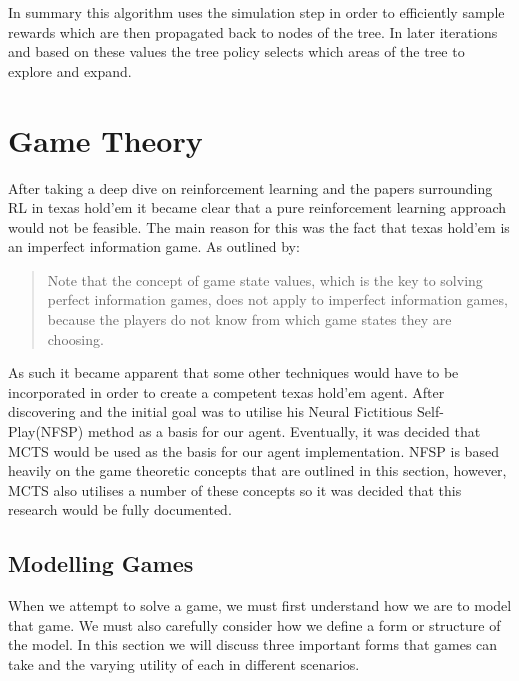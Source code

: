 In summary this algorithm uses the simulation step in order to efficiently sample rewards which
are then propagated back to nodes of the tree.
In later iterations and based on these values the tree policy selects which areas of the tree to
explore and expand.

\section{Game Theory}\label{sec:gameTheory}
After taking a deep dive on reinforcement learning and the papers surrounding RL in texas hold'em it became
clear that a pure reinforcement learning approach would not be feasible.
The main reason for this was the fact that texas hold'em is an imperfect information game.
As outlined by\citep{dahl2001reinforcement}:
\begin{quotation}
Note that the concept of game state values, which is the key to solving perfect information games,
does not apply to imperfect information games, because the players do not know from  which game states they
are choosing.
\end{quotation}
As such it became apparent that some other techniques would have to be incorporated in order to create a competent
texas hold'em agent.
After discovering\citep{heinrich2016deep} and\citep{heinrich2017reinforcement} the initial goal
was to utilise his Neural Fictitious Self-Play(NFSP) method as a basis for our agent.
Eventually, it was decided that MCTS would be used as the basis for our agent implementation.
NFSP is based heavily on the game theoretic concepts that are outlined in this section, however,
MCTS also utilises a number of these concepts so it was decided that this research would be fully documented.

\subsection{Modelling Games}\label{subsec:modellingGames}
When we attempt to solve a game, we must first understand how we are to model that game.
We must also carefully consider how we define a form or structure of the model\citep{myerson2013game}.
In this section we will discuss three important forms that games can take and the varying utility
of each in different scenarios.


